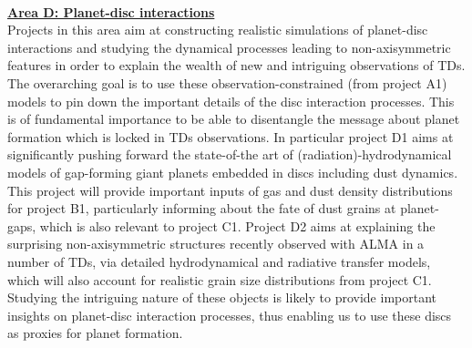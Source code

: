 \documentclass[10pt,fleqn,twoside]{article}
\newcommand{\AreacolD}{\color{Red}}
\begin{document}
\mbox{}\vspace{1em}\\
\noindent\underline{\bf\AreacolD Area D: Planet-disc interactions}\\
\noindent Projects in this area aim at constructing realistic
simulations of planet-disc interactions and studying the dynamical processes
leading to non-axisymmetric features in order to explain the wealth of new
and intriguing observations of TDs. The overarching goal is to use
these observation-constrained (from project A1) models to pin down
the important details of the disc interaction processes. This is of
fundamental importance to be able to disentangle the message about
planet formation which is locked in TDs observations. In particular
project D1 aims at significantly pushing forward the state-of-the art
of (radiation)-hydrodynamical models of gap-forming giant planets
embedded in discs including dust dynamics. 
This project will provide important inputs of
gas and dust density distributions for project B1, particularly informing about the
fate of dust grains at planet-gaps, which is also relevant to project
C1. Project D2 aims at explaining the surprising non-axisymmetric
structures recently observed with ALMA in a number of TDs, via
detailed hydrodynamical and radiative transfer models, which will also
account for realistic grain size distributions from project
C1. Studying the intriguing nature of these objects is likely to
provide important insights on planet-disc interaction processes, thus
enabling us to use these discs as proxies for planet formation.  \\ 
\end{document}
